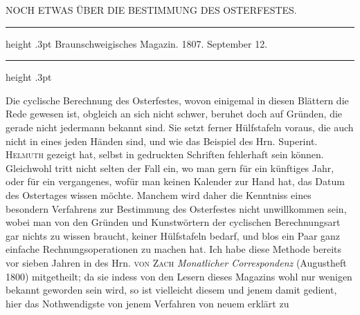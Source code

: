 \par\clearpage
\begingroup
\pagestyle{empty}
\newcommand{\GaussVIGathering}[2]{%
  \fancypagestyle{gaussVIGathering}{%
    \fancyhf{}%
    \renewcommand{\headrulewidth}{0pt}%
    \renewcommand{\footrulewidth}{0pt}%
    \fancyfoot[C]{\makebox[\textwidth][l]{%
      \hspace*{.025\textwidth}{\footnotesize\bfseries #1}\hfill
      {\normalsize\bfseries\textls[90]{#2}}\hspace*{.18\textwidth}}}%
  }%
  \thispagestyle{gaussVIGathering}%
}
\thispagestyle{empty}
%
\vspace*{.26\textheight}
\begin{center}
NOCH ETWAS ÜBER DIE BESTIMMUNG DES OSTERFESTES.
\end{center}
\begin{center}
\parbox{.60\linewidth}{%
  \centering\fontsize{8}{10}\selectfont\frenchspacing
  \hrule height .3pt\relax\vspace{3pt}
  Braunschweigisches Magazin. 1807. September 12.\par
  \vspace{3pt}\hrule height .3pt\relax
}
\end{center}
\par\indent Die cyclische Berechnung des Osterfestes, wovon einigemal in diesen Blättern
die Rede gewesen ist, obgleich an sich nicht schwer, beruhet doch auf Gründen,
die gerade nicht jedermann bekannt sind. Sie setzt ferner Hülfstafeln voraus,
die auch nicht in eines jeden Händen sind, und wie das Beispiel des Hrn.
Superint. \textsc{Helmuth} gezeigt hat, selbst in gedruckten Schriften fehlerhaft sein
können. Gleichwohl tritt nicht selten der Fall ein, wo man gern für ein künftiges
Jahr, oder für ein vergangenes, wofür man keinen Kalender zur Hand hat,
das Datum des Ostertages wissen möchte. Manchem wird daher die Kenntniss
eines besondern Verfahrens zur Bestimmung des Osterfestes nicht unwillkommen
sein, wobei man von den Gründen und Kunstwörtern der cyclischen Berechnungsart
gar nichts zu wissen braucht, keiner Hülfstafeln bedarf, und blos ein
Paar ganz einfache Rechnungsoperationen zu machen hat. Ich habe diese Methode
bereits vor sieben Jahren in des Hrn. \textsc{von Zach} \textit{Monatlicher Correspondenz}
(Augustheft 1800) mitgetheilt; da sie indess von den Lesern dieses Magazins wohl
nur wenigen bekannt geworden sein wird, so ist vielleicht diesem und jenem damit
gedient, hier das Nothwendigste von jenem Verfahren von neuem erklärt zu
